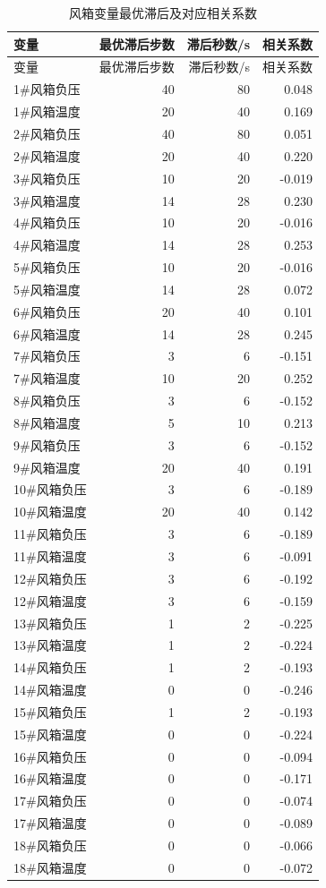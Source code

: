 \documentclass[UTF8,a4paper,zihao=-4]{ctexart}
\begin{document}
\begin{longtable}{lrrr}
\caption{风箱变量最优滞后及对应相关系数}\\
\toprule
变量 & 最优滞后步数 & 滞后秒数/s & 相关系数 \\
\midrule
\endfirsthead

\toprule
变量 & 最优滞后步数 & 滞后秒数/s & 相关系数 \\
\midrule
\endhead

\midrule
\endfoot

\bottomrule
\endlastfoot

1\#风箱负压 & 40 & 80 & 0.048 \\
1\#风箱温度 & 20 & 40 & 0.169 \\
2\#风箱负压 & 40 & 80 & 0.051 \\
2\#风箱温度 & 20 & 40 & 0.220 \\
3\#风箱负压 & 10 & 20 & -0.019 \\
3\#风箱温度 & 14 & 28 & 0.230 \\
4\#风箱负压 & 10 & 20 & -0.016 \\
4\#风箱温度 & 14 & 28 & 0.253 \\
5\#风箱负压 & 10 & 20 & -0.016 \\
5\#风箱温度 & 14 & 28 & 0.072 \\
6\#风箱负压 & 20 & 40 & 0.101 \\
6\#风箱温度 & 14 & 28 & 0.245 \\
7\#风箱负压 & 3 & 6 & -0.151 \\
7\#风箱温度 & 10 & 20 & 0.252 \\
8\#风箱负压 & 3 & 6 & -0.152 \\
8\#风箱温度 & 5 & 10 & 0.213 \\
9\#风箱负压 & 3 & 6 & -0.152 \\
9\#风箱温度 & 20 & 40 & 0.191 \\
10\#风箱负压 & 3 & 6 & -0.189 \\
10\#风箱温度 & 20 & 40 & 0.142 \\
11\#风箱负压 & 3 & 6 & -0.189 \\
11\#风箱温度 & 3 & 6 & -0.091 \\
12\#风箱负压 & 3 & 6 & -0.192 \\
12\#风箱温度 & 3 & 6 & -0.159 \\
13\#风箱负压 & 1 & 2 & -0.225 \\
13\#风箱温度 & 1 & 2 & -0.224 \\
14\#风箱负压 & 1 & 2 & -0.193 \\
14\#风箱温度 & 0 & 0 & -0.246 \\
15\#风箱负压 & 1 & 2 & -0.193 \\
15\#风箱温度 & 0 & 0 & -0.224 \\
16\#风箱负压 & 0 & 0 & -0.094 \\
16\#风箱温度 & 0 & 0 & -0.171 \\
17\#风箱负压 & 0 & 0 & -0.074 \\
17\#风箱温度 & 0 & 0 & -0.089 \\
18\#风箱负压 & 0 & 0 & -0.066 \\
18\#风箱温度 & 0 & 0 & -0.072 \\

\end{longtable}
\end{document}
